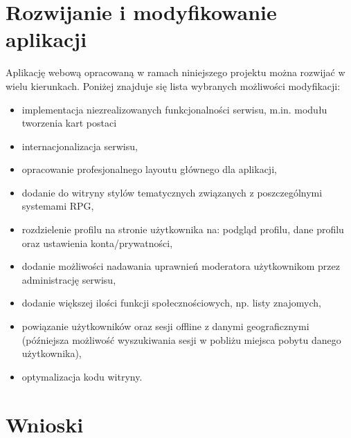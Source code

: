 
\section{Rozwijanie i modyfikowanie aplikacji}
\label{sec:rozwoj}

\hspace{15pt}Aplikację webową opracowaną w ramach niniejszego projektu można rozwijać w wielu kierunkach. Poniżej znajduje się lista wybranych możliwości modyfikacji:
\begin{itemize}
\item implementacja niezrealizowanych funkcjonalności serwisu, m.in. modułu tworzenia kart postaci
\item internacjonalizacja serwisu,
\item opracowanie profesjonalnego layoutu głównego dla aplikacji,
\item dodanie do witryny stylów tematycznych związanych z poszczególnymi systemami RPG,
\item rozdzielenie profilu na stronie użytkownika na: podgląd profilu, dane profilu oraz ustawienia konta/prywatności,
\item dodanie możliwości nadawania uprawnień moderatora użytkownikom przez administrację serwisu,
\item dodanie większej ilości funkcji społecznościowych, np. listy znajomych,
\item powiązanie użytkowników oraz sesji offline z danymi geograficznymi (późniejsza możliwość wyszukiwania sesji w pobliżu miejsca pobytu danego użytkownika),
\item optymalizacja kodu witryny.
\end{itemize}


\section{Wnioski}
\label{sec:doswiadczenia}

